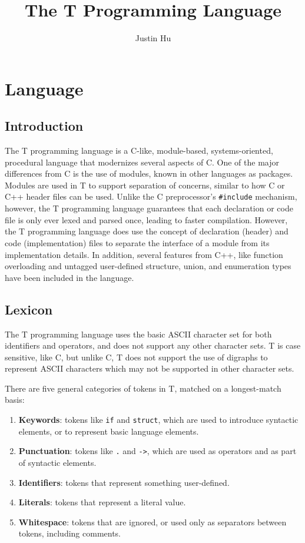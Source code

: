\documentclass[letterpaper,12pt]{book}
\begin{document}
\title{The T Programming Language}
\author{Justin Hu}
\maketitle
\tableofcontents

\part{Language}

\setcounter{chapter}{-1} %
\chapter{Introduction}

The T programming language is a C-like, module-based, systems-oriented, procedural language that modernizes several aspects of C. One of the major differences from C is the use of modules, known in other languages as packages. Modules are used in T to support separation of concerns, similar to how C or C++ header files can be used. Unlike the C preprocessor's \texttt{\#include} mechanism, however, the T programming language guarantees that each declaration or code file is only ever lexed and parsed once, leading to faster compilation. However, the T programming language does use the concept of declaration (header) and code (implementation) files to separate the interface of a module from its implementation details. In addition, several features from C++, like function overloading and untagged user-defined structure, union, and enumeration types have been included in the language.

\chapter{Lexicon}

The T programming language uses the basic ASCII character set for both identifiers and operators, and does not support any other character sets. T is case sensitive, like C, but unlike C, T does not support the use of digraphs to represent ASCII characters which may not be supported in other character sets.

There are five general categories of tokens in T, matched on a longest-match basis:

\begin{enumerate}
	\item \textbf{Keywords}: tokens like \texttt{if} and \texttt{struct}, which are used to introduce syntactic elements, or to represent basic language elements.
	\item \textbf{Punctuation}: tokens like \texttt{.} and \texttt{->}, which are used as operators and as part of syntactic elements.
	\item \textbf{Identifiers}: tokens that represent something user-defined.
	\item \textbf{Literals}: tokens that represent a literal value.
	\item \textbf{Whitespace}: tokens that are ignored, or used only as separators between tokens, including comments.
\end{enumerate}
\end{document}
